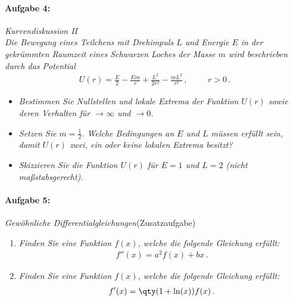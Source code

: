 \paragraph{Aufgabe 4: } \emph{Kurvendiskussion II}\\[0.2cm]
\emph{Die Bewegung eines Teilchens mit Drehimpuls $L$ und Energie $E$ in der gekrümmten Raumzeit eines Schwarzen Loches der Masse $m$ wird beschrieben durch das Potential}
\begin{align*}
U(r)=\frac{E}{2}-\frac{Em}{r}+\frac{L^2}{2r^2}-\frac{mL^2}{r^3}\,, \hspace{1cm} r>0\,.
\end{align*}
\begin{itemize}
\item \emph{Bestimmen Sie Nullstellen und lokale Extrema der Funktion $U(r)$ sowie deren Verhalten für $\to\infty$ und $\to 0$.}
\item \emph{Setzen Sie $\textstyle m=\frac{1}{2}$. Welche Bedingungen an $E$ und $L$ müssen erfüllt sein, damit $U(r)$ zwei, ein oder keine lokalen Extrema besitzt?}
\item \emph{Skizzieren Sie die Funktion $U(r)$ für $E=1$ und $L=2$ (nicht maßstabsgerecht).}
\end{itemize} 
%
\paragraph{Aufgabe 5: } \emph{Gewöhnliche Differentialgleichungen}\hfill (Zusatzaufgabe)\\[0.2cm]
\begin{enumerate}[label=(\alph*)]
\item \emph{Finden Sie eine Funktion $f(x)$, welche die folgende Gleichung erfüllt:}
\begin{align*}
f''(x)=a^2f(x)+bx\,.
\end{align*}
\item \emph{Finden Sie eine Funktion $f(x)$, welche die folgende Gleichung erfüllt:}
\begin{align*}
f'(x)=\qty(1+\ln(x))f(x)\,.
\end{align*}
\end{enumerate}